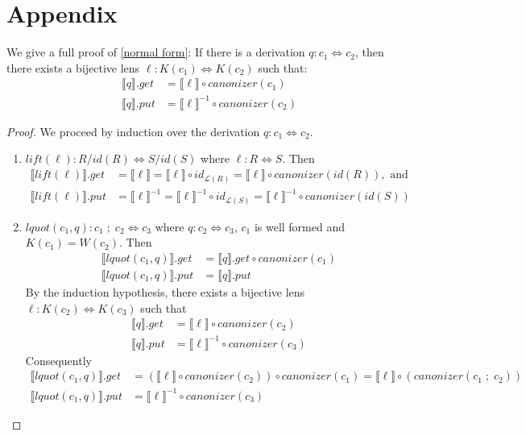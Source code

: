 \documentclass[acmsmall,review,anonymous]{acmart}
\newcommand{\kw}[1]{\ensuremath{\mathit{#1}}}
\newcommand{\canonizer}{\ensuremath{\kw{canonizer}}}
\newcommand{\get}{\ensuremath{\kw{get}}}
\newcommand{\lput}{\ensuremath{\kw{put}}}
\begin{document}
\section{Appendix}
We give a full proof of \cref{normal form}: If there is a derivation $q : c_1
\Leftrightarrow c_2$, then there exists a bijective lens $\ell : K(c_1)
\Leftrightarrow K(c_2)$ such that:
\begin{align*}
\llbracket q \rrbracket.\get &= \llbracket \ell \rrbracket\circ
\canonizer(c_1)\\
\llbracket q \rrbracket.\lput &= \llbracket \ell \rrbracket^{-1} \circ
\canonizer(c_2)
\end{align*}
\begin{proof}
We proceed by induction over the derivation $q : c_1 \Leftrightarrow c_2$.
\begin{enumerate}
  \item
  $\kw{lift}(\ell): R/\mathit{id}(R) \Leftrightarrow S/\mathit{id}(S)$ where
  $\ell : R \Leftrightarrow S$. Then
  \begin{align*}
\llbracket \kw{lift}(\ell) \rrbracket.\get &=  \llbracket \ell \rrbracket
= \llbracket \ell \rrbracket \circ id_{\mathcal{L}(R)} =
\llbracket \ell \rrbracket \circ \canonizer(\mathit{id}(R)), \text{ and }\\
\llbracket \kw{lift}(\ell) \rrbracket.\lput &= \llbracket \ell
\rrbracket^{-1} = \llbracket \ell \rrbracket^{-1} \circ id_{\mathcal{L}(S)} =
\llbracket \ell \rrbracket^{-1} \circ \canonizer(id(S))
\end{align*}
\item
$\kw{lquot}(c_1, q): c_1 \; ; \; c_2 \Leftrightarrow c_3$ where $q : c_2
\Leftrightarrow c_3$, $c_1$ is well formed and $K(c_1) = W(c_2)$. Then
\begin{align*}
\llbracket \kw{lquot}(c_1, q) \rrbracket.\get  &= \llbracket q
\rrbracket.\get \circ \canonizer(c_1)\\
\llbracket \kw{lquot}(c_1, q) \rrbracket.\lput &= \llbracket q \rrbracket.\lput
\end{align*}
By the induction hypothesis, there exists a bijective lens $\ell :
K(c_2) \Leftrightarrow K(c_3)$ such that
\begin{align*}
\llbracket q \rrbracket.\get &= \llbracket \ell \rrbracket \circ
\canonizer(c_2)\\
\llbracket q \rrbracket.\lput &= \llbracket \ell \rrbracket^{-1} \circ
\canonizer(c_3)
\end{align*}
Consequently
\begin{align*}
\llbracket \kw{lquot}(c_1, q)\rrbracket.\get  &= (\llbracket \ell \rrbracket \circ
\canonizer(c_2)) \circ \canonizer(c_1) = \llbracket \ell \rrbracket \circ
(\canonizer(c_1 \; ; \; c_2))\\
\llbracket \kw{lquot}(c_1, q) \rrbracket.\lput &= \llbracket \ell \rrbracket^{-1} \circ
\canonizer(c_3)
\end{align*}


\end{enumerate}
\end{proof}
\end{document}
